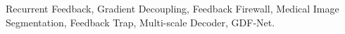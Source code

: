 \documentclass[journal, 10pt]{IEEEtran}
\begin{document}
\begin{IEEEkeywords}
Recurrent Feedback, Gradient Decoupling, Feedback Firewall, Medical Image Segmentation, Feedback Trap, Multi-scale Decoder, GDF-Net.
\end{IEEEkeywords}









\end{document}
